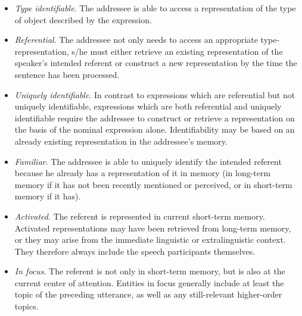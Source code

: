 \begin{itemize}
\item \textit{Type identifiable}. The addressee is able to access a representation of the type of object described by the expression.
\item \textit{Referential}. The addressee not only needs to access an appropriate type-representation, s/he must either retrieve an existing representation of the speaker's intended referent or construct a new representation by the time the sentence has been processed. 
\item\textit{Uniquely identifiable}. In contrast to expressions which are referential but not uniquely identifiable, expressions which are both referential and uniquely identifiable require the addressee to construct or retrieve a representation on the basis of the nominal expression alone. Identifiability may be based on an already existing representation in the addressee's memory. 
\item \textit{Familiar}. The addressee is able to uniquely identify the intended referent because he already has a representation of it in memory (in long-term memory if it has not been recently mentioned or perceived, or in short-term memory if it has). 
\item \textit{Activated}. The referent is represented in current short-term memory. Activated representations may have been retrieved from long-term memory, or they may arise from the immediate linguistic or extralinguistic context. They therefore always include the speech participants themselves.
\item \textit{In focus}. The referent is not only in short-term memory, but is also at the current center of attention. Entities in focus generally include at least the topic of the preceding utterance, as well as any still-relevant higher-order topics.
\end{itemize}
\z


